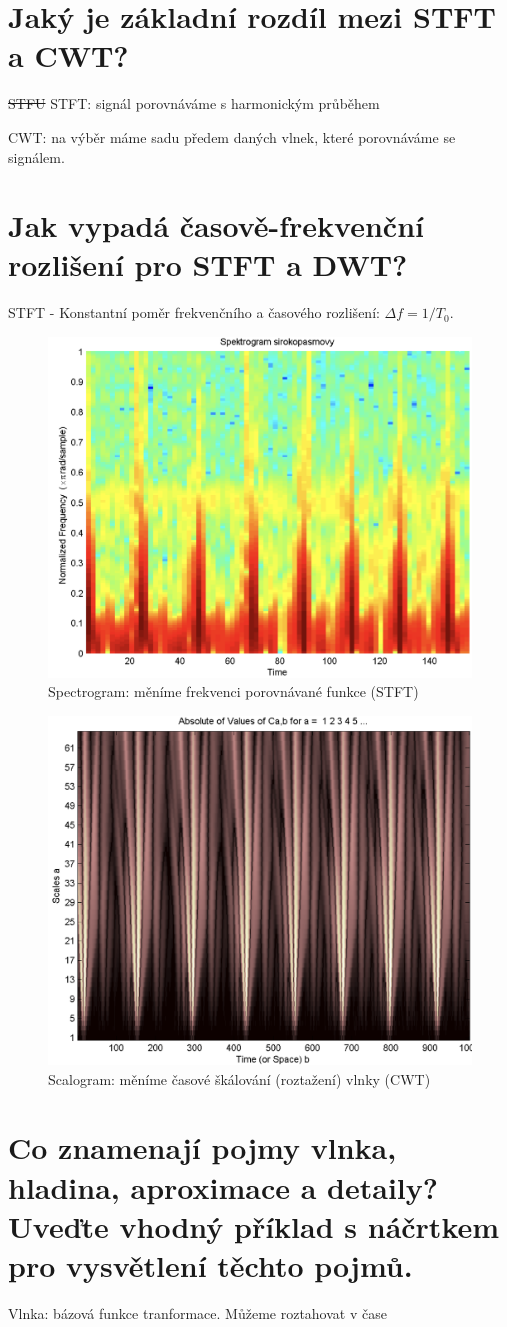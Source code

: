 \documentclass[a4paper,12pt]{article}   %
\newcommand{\mt}[1]{$#1$}
\begin{document}
\section{Jaký je základní rozdíl mezi STFT a CWT?}
\sout{STFU} STFT: signál porovnáváme s harmonickým průběhem

CWT: na výběr máme sadu předem daných vlnek, které porovnáváme se signálem. 

\section{Jak vypadá časově-frekvenční rozlišení pro STFT a DWT?}
STFT - Konstantní poměr frekvenčního a časového rozlišení: \mt{\Delta f = 1/T_0}.

\begin{figure}[h]
        \centering
        \includegraphics[width=.5\textwidth]{fig/spectrogram.png}
        \caption*{Spectrogram: měníme frekvenci porovnávané funkce (STFT)}
\end{figure}
\begin{figure}[h]
        \centering
        \includegraphics[width=.5\textwidth]{fig/scalogram.png}
        \caption*{Scalogram: měníme časové škálování (roztažení) vlnky (CWT)}
\end{figure}
\FloatBarrier

\section{Co znamenají pojmy vlnka, hladina, aproximace a detaily? Uveďte vhodný příklad s náčrtkem pro vysvětlení těchto pojmů.}
Vlnka: bázová funkce tranformace. Můžeme roztahovat v čase
\end{document}
